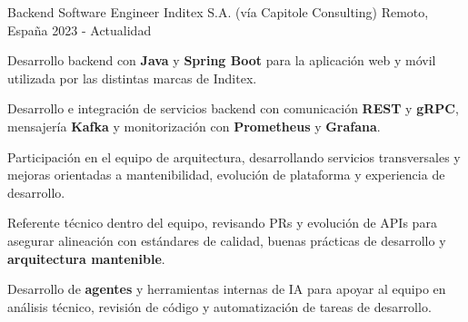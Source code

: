   \cventry
    {Backend Software Engineer}
    {Inditex S.A. \textnormal{(vía Capitole Consulting)}}
  {Remoto, España}
  {2023 - Actualidad}
  {
    \begin{cvitems}
      \item {Desarrollo backend con \textbf{Java} y \textbf{Spring Boot} para la aplicación web y móvil utilizada por las distintas marcas de Inditex.}
      \item {Desarrollo e integración de servicios backend con comunicación \textbf{REST} y \textbf{gRPC}, mensajería \textbf{Kafka} y monitorización con \textbf{Prometheus} y \textbf{Grafana}.}
      \item {Participación en el equipo de arquitectura, desarrollando servicios transversales y mejoras orientadas a mantenibilidad, evolución de plataforma y experiencia de desarrollo.}
      \item {Referente técnico dentro del equipo, revisando PRs y evolución de APIs para asegurar alineación con estándares de calidad, buenas prácticas de desarrollo y \textbf{arquitectura mantenible}.}
      \item {Desarrollo de \textbf{agentes} y herramientas internas de IA para apoyar al equipo en análisis técnico, revisión de código y automatización de tareas de desarrollo.}
    \end{cvitems}
  }
